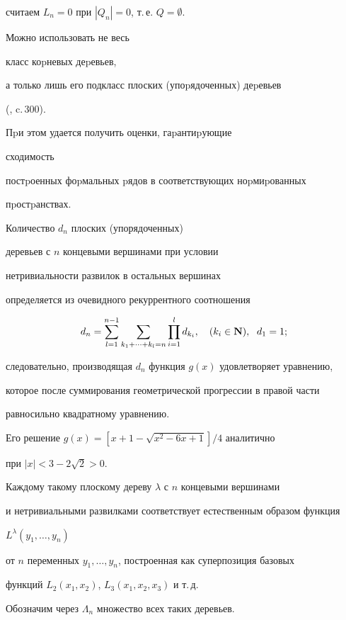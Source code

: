 считаем $L_n=0$ при $|Q_n|=0$, т.\,е. $Q=\emptyset$.





Можно использовать не весь


класс коpневых деpевьев,


а только лишь его подкласс плоских (упоpядоченных) деpевьев


(\cite{1}, c.\,300).


Пpи этом удается получить оценки, гаpантиpующие


сходимость


постpоенных фоpмальных pядов в соответствующих ноpмиpованных


пpостpанствах.


Количество $d_n$ плоских (упорядоченных)


деревьев с $n$ концевыми вершинами при условии


нетривиальности развилок в остальных вершинах


определяется из очевидного рекуррентного соотношения


$$


d_n=\sum_{l=1}^{ n-1}


\sum_{ k_1+\dotsb+k_l=n} \prod_{ i=1}^{l}d_{k_i} ,


\quad (k_i\in {\bold N}), \ \; d_1=1;


$$


следовательно, производящая $d_n$ функция $g(x)$ удовлетворяет уравнению,


которое после суммирования геометрической прогрессии в правой части


равносильно квадратному уравнению.


Его решение $g(x)=[x+1-\sqrt{ x^2-6x+1}]/4$ аналитично


при $|x|<3-2\sqrt{2}>0$.





Каждому такому плоскому дереву $\lambda$ с $n$ концевыми вершинами


и нетривиальными развилками соответствует естественным образом функция


$L^\lambda(y_1,\dotsc,y_n)$


от $n$ переменных $y_1,\dotsc,y_n$, построенная как суперпозиция базовых


функций $L_2(x_1,x_2)$, $L_3(x_1,x_2,x_3)$ и т.\,д.


Обозначим через $\Lambda_n$ множество всех таких деревьев.


